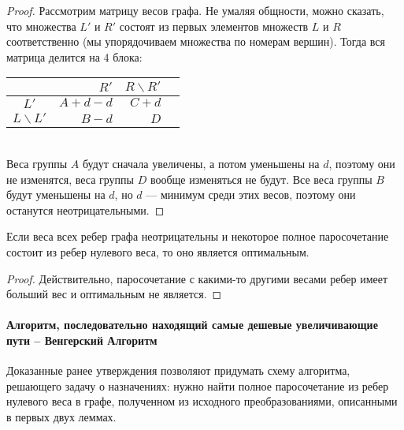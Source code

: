 \documentclass[a4paper,12pt]{article}
\begin{document}
\begin{proof}
Рассмотрим матрицу весов графа. Не умаляя общности, можно сказать, что множества $L'$ и $R'$ состоят из первых элементов множеств $L$ и $R$ соответственно (мы упорядочиваем множества по номерам вершин). Тогда вся матрица делится на 4 блока:
\ \\

\begin{tabular}{c||*{3}{r|}|}
& $R'$ & $R \backslash R'$\\
\hline
\hline
$L'$ & $A + d - d$ & $C + d$\\
$L \backslash L'$ & $B - d$ & $D$\\
\hline
\end{tabular}\\

Веса группы $A$ будут сначала увеличены, а потом уменьшены на $d$, поэтому они не изменятся, веса группы $D$ вообще изменяться не будут. Все веса группы $B$ будут уменьшены на $d$, но $d$ — минимум среди этих весов, поэтому они останутся неотрицательными.
\end{proof}
\begin{fulllemma}
Если веса всех ребер графа неотрицательны и некоторое полное паросочетание состоит из ребер нулевого веса, то оно является оптимальным.
\end{fulllemma}
\begin{proof}
Действительно, паросочетание с какими-то другими весами ребер имеет больший вес и оптимальным не является.
\end{proof}

\paragraph{Алгоритм, последовательно находящий самые дешевые увеличивающие пути -- Венгерский Алгоритм}

Доказанные ранее утверждения позволяют придумать схему алгоритма, решающего задачу о назначениях: нужно найти полное паросочетание из ребер нулевого веса в графе, полученном из исходного преобразованиями, описанными в первых двух леммах.
\end{document}
